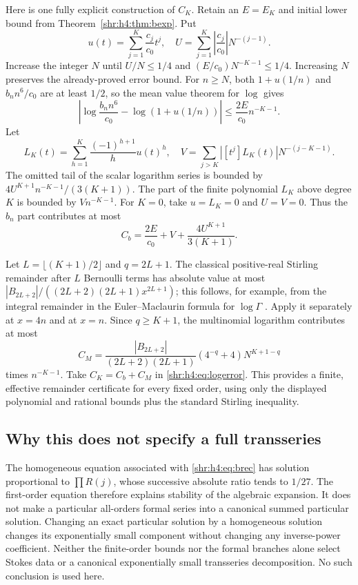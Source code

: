 \documentclass[11pt,letterpaper]{article}
\numberwithin{equation}{section}
\theoremstyle{definition}
\newcommand{\1}{\mathbf 1}
\begin{document}
Here is one fully explicit construction of $C_K$. Retain an $E=E_K$ and
initial lower bound from Theorem~\ref{shr:h4:thm:bexp}. Put
\[
 u(t)=\sum_{j=1}^K\frac{c_j}{c_0}t^j,
 \quad U=\sum_{j=1}^K\left|\frac{c_j}{c_0}\right|N^{-(j-1)}.
\]
Increase the integer $N$ until $U/N\le1/4$ and
$(E/c_0)N^{-K-1}\le1/4$. Increasing $N$ preserves the already-proved
error bound. For $n\ge N$, both $1+u(1/n)$ and $b_nn^6/c_0$ are at
least $1/2$, so the mean value theorem for $\log$ gives
\[
 \left|\log\frac{b_nn^6}{c_0}-\log(1+u(1/n))\right|
 \le\frac{2E}{c_0}n^{-K-1}.
\]
Let
\[
 L_K(t)=\sum_{h=1}^K\frac{(-1)^{h+1}}h u(t)^h,
 \quad
 V=\sum_{j>K}|[t^j]L_K(t)|N^{-(j-K-1)}.
\]
The omitted tail of the scalar logarithm series is bounded by
$4U^{K+1}n^{-K-1}/(3(K+1))$. The part of the finite polynomial $L_K$
above degree $K$ is bounded by $Vn^{-K-1}$. For $K=0$, take $u=L_K=0$
and $U=V=0$. Thus the $b_n$ part contributes at most
\begin{equation}
 C_b=\frac{2E}{c_0}+V+\frac{4U^{K+1}}{3(K+1)}.
 \label{shr:h4:eq:Cb}
\end{equation}

Let $L=\lfloor(K+1)/2\rfloor$ and $q=2L+1$. The classical positive-real
Stirling remainder after $L$ Bernoulli terms has absolute value at most
$|B_{2L+2}|/((2L+2)(2L+1)x^{2L+1})$; this follows, for example, from the
integral remainder in the Euler--Maclaurin formula for $\log\Gamma$
\cite{DLMFgamma}. Apply it separately at $x=4n$ and at $x=n$. Since $q\ge K+1$,
the multinomial logarithm contributes at most
\begin{equation}
 C_M=\frac{|B_{2L+2}|}{(2L+2)(2L+1)}(4^{-q}+4)N^{K+1-q}
 \label{shr:h4:eq:CM}
\end{equation}
times $n^{-K-1}$. Take $C_K=C_b+C_M$ in \eqref{shr:h4:eq:logerror}.
This provides a finite, effective remainder certificate for every fixed
order, using only the displayed polynomial and rational bounds plus the
standard Stirling inequality.

\subsection{Why this does not specify a full transseries}
The homogeneous equation associated with \eqref{shr:h4:eq:brec} has solution
proportional to $\prod R(j)$, whose successive absolute ratio tends to
$1/27$. The first-order equation therefore explains stability of the
algebraic expansion. It does not make a particular all-orders formal
series into a canonical summed particular solution. Changing an exact
particular solution by a homogeneous solution changes its exponentially
small component without changing any inverse-power coefficient.
Neither the finite-order bounds nor the formal branches alone select
Stokes data or a canonical exponentially small transseries decomposition.
No such conclusion is used here.
\end{document}
